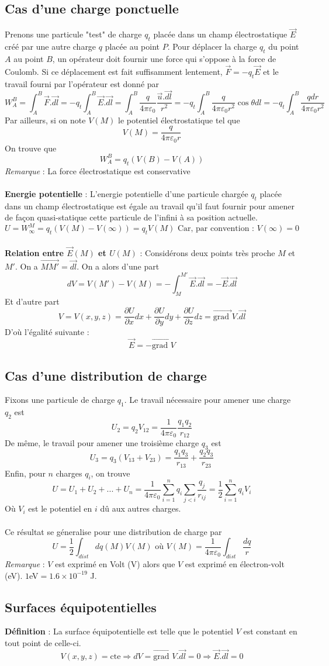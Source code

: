 \subsection{Cas d'une charge ponctuelle}
Prenons une particule "test" de charge $q_t$ placée dans un champ électrostatique $\vec{E}$ créé par une autre charge $q$ placée au point $P$. Pour déplacer la charge $q_t$ du point $A$ au point $B$, un opérateur doit fournir une force qui s'oppose à la force de Coulomb. Si ce déplacement est fait suffisamment lentement, $\vec{F}=-q_t\vec{E}$ et le travail fourni par l'opérateur est donné par \[ W_A^B=\int_A^B\vec{F}.\vec{dl}=-q_t\int_A^B\vec{E}.\vec{dl}=\int_A^B\frac{q}{4\pi\varepsilon_0}\frac{\vec{u}.\vec{dl}}{r^2}=-q_t\int_A^B\frac{q}{4\pi\varepsilon_0 r^2}\cos\theta dl=-q_t\int_A^B\frac{qdr}{4\pi\varepsilon_0 r^2} \]
Par ailleurs, si on note $V(M)$ le potentiel électrostatique tel que \[ V(M)=\frac{q}{4\pi\varepsilon_0 r} \]
On trouve que \[ W_A^B = q_t(V(B)-V(A)) \]
\emph{Remarque} : La force électrostatique est conservative\\\\
\noindent\textbf{Energie potentielle} : L'energie potentielle d'une particule chargée $q_t$ placée dans un champ électrostatique est égale au travail qu'il faut fournir pour amener de façon quasi-statique cette particule de l'infini à sa position actuelle.
\[ U=W_\infty^M=q_t(V(M)-V(\infty))=q_tV(M) \textrm{ Car, par convention : }V(\infty)=0 \]\\
\noindent\textbf{Relation entre $\vec{E}(M)$ et $U(M)$} : Considérons deux points très proche $M$ et $M'$. On a $\vec{MM'}=\vec{dl}$. On a alors d'une part
\[ dV=V(M')-V(M)=-\int_M^{M'}\vec{E}.\vec{dl}=-\vec{E}.\vec{dl} \]
Et d'autre part
\[ V=V(x,y,z)=\frac{\partial U}{\partial x}dx+\frac{\partial U}{\partial y}dy+\frac{\partial U}{\partial z}dz=\vec{\textrm{grad }}V.\vec{dl} \]
D'où  l'égalité suivante :
\[ \vec{E}=-\vec{\textrm{grad }}V \]

\subsection{Cas d'une distribution de charge}

Fixons une particule de charge $q_1$. Le travail nécessaire pour amener une charge $q_2$ est \[ U_2=q_2V_{12}=\frac{1}{4\pi\varepsilon_0}\frac{q_1q_2}{r_{12}} \]
De même, le travail pour amener une troisième charge $q_3$ est \[ U_3=q_3(V_{13}+V_{23})=\frac{q_1q_3}{r_{13}}+\frac{q_2q_3}{r_{23}} \]
Enfin, pour $n$ charges $q_i$, on trouve
\[ U=U_1+U_2+...+U_n=\frac{1}{4\pi\varepsilon_0}\sum_{i=1}^nq_i\sum_{j<i}\frac{q_j}{r_{ij}}=\frac{1}{2}\sum_{i=1}^nq_iV_i \] Où $V_i$ est le potentiel en $i$ dû aux autres charges. \\\\
\noindent Ce résultat se géneralise pour une distribution de charge par
\[ U=\frac{1}{2}\int_{dist}dq(M)V(M) \textrm{ où }V(M)=\frac{1}{4\pi\varepsilon_0}\int_{dist}\frac{dq}{r} \]
\emph{Remarque} : $V$ est exprimé en Volt (V) alors que $V$ est exprimé en électron-volt (eV). $1 $eV$=1.6\times 10^{-19}$ J.

\subsection{Surfaces équipotentielles}

\noindent\textbf{Définition} : La surface équipotentielle est telle que le potentiel $V$ est constant en tout point de celle-ci.
\[V(x,y,z)=\textrm{cte}\Rightarrow dV=\vec{\textrm{grad }}V.\vec{dl}=0\Rightarrow\vec{E}.\vec{dl}=0\]
